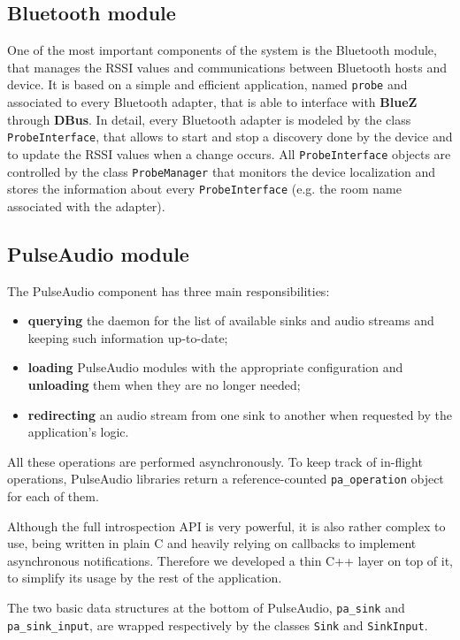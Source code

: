 \documentclass[conference]{IEEEtran}
\begin{document}
\subsection{Bluetooth module}
One of the most important components of the system is the Bluetooth module, that manages the RSSI values and communications between Bluetooth hosts and device. It is based on a simple and efficient application, named \texttt{probe} and associated to every Bluetooth adapter, that is able to interface with \textbf{BlueZ} through \textbf{DBus}. In detail, every Bluetooth adapter is modeled by the class \texttt{ProbeInterface}, that allows to start and stop a discovery done by the device and to update the RSSI values when a change occurs. All \texttt{ProbeInterface} objects are controlled by the class \texttt{ProbeManager} that monitors the device localization and stores the information about every \texttt{ProbeInterface} (e.g. the room name associated with the adapter).

\subsection{PulseAudio module}
The PulseAudio component has three main responsibilities:
\begin{itemize}
	\item \textbf{querying} the daemon for the list of available sinks and audio streams and keeping such information up-to-date;
	\item \textbf{loading} PulseAudio modules with the appropriate configuration and \textbf{unloading} them when they are no longer needed;
	\item \textbf{redirecting} an audio stream from one sink to another when requested by the application's logic.
\end{itemize}
All these operations are performed asynchronously. To keep track of in-flight operations, PulseAudio libraries return a reference-counted \texttt{pa\_operation} object for each of them.

Although the full introspection API is very powerful, it is also rather complex to use, being written in plain C and heavily relying on callbacks to implement asynchronous notifications. Therefore we developed a thin C++ layer on top of it, to simplify its usage by the rest of the application.

The two basic data structures at the bottom of PulseAudio, \texttt{pa\_sink} and \texttt{pa\_sink\_input}, are wrapped respectively by the classes \texttt{Sink} and \texttt{SinkInput}.
\end{document}
